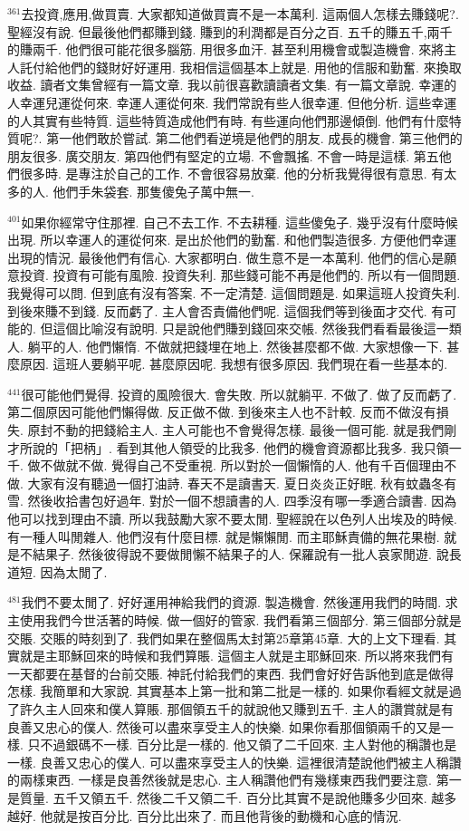 \documentclass{book}
\begin{document}
$^{361}$去投資,應用,做買賣.
大家都知道做買賣不是一本萬利.
這兩個人怎樣去賺錢呢?.
聖經沒有說.
但最後他們都賺到錢.
賺到的利潤都是百分之百.
五千的賺五千,兩千的賺兩千.
他們很可能花很多腦筋.
用很多血汗.
甚至利用機會或製造機會.
來將主人託付給他們的錢財好好運用.
我相信這個基本上就是.
用他的信服和勤奮.
來換取收益.
讀者文集曾經有一篇文章.
我以前很喜歡讀讀者文集.
有一篇文章說.
幸運的人幸運兒運從何來.
幸運人運從何來.
我們常說有些人很幸運.
但他分析.
這些幸運的人其實有些特質.
這些特質造成他們有時.
有些運向他們那邊傾倒.
他們有什麼特質呢?.
第一他們敢於嘗試.
第二他們看逆境是他們的朋友.
成長的機會.
第三他們的朋友很多.
廣交朋友.
第四他們有堅定的立場.
不會飄搖.
不會一時是這樣.
第五他們很多時.
是專注於自己的工作.
不會很容易放棄.
他的分析我覺得很有意思.
有太多的人.
他們手朱袋套.
那隻傻兔子萬中無一.

$^{401}$如果你經常守住那裡.
自己不去工作.
不去耕種.
這些傻兔子.
幾乎沒有什麼時候出現.
所以幸運人的運從何來.
是出於他們的勤奮.
和他們製造很多.
方便他們幸運出現的情況.
最後他們有信心.
大家都明白.
做生意不是一本萬利.
他們的信心是願意投資.
投資有可能有風險.
投資失利.
那些錢可能不再是他們的.
所以有一個問題.
我覺得可以問.
但到底有沒有答案.
不一定清楚.
這個問題是.
如果這班人投資失利.
到後來賺不到錢.
反而虧了.
主人會否責備他們呢.
這個我們等到後面才交代.
有可能的.
但這個比喻沒有說明.
只是說他們賺到錢回來交帳.
然後我們看看最後這一類人.
躺平的人.
他們懶惰.
不做就把錢埋在地上.
然後甚麼都不做.
大家想像一下.
甚麼原因.
這班人要躺平呢.
甚麼原因呢.
我想有很多原因.
我們現在看一些基本的.

$^{441}$很可能他們覺得.
投資的風險很大.
會失敗.
所以就躺平.
不做了.
做了反而虧了.
第二個原因可能他們懶得做.
反正做不做.
到後來主人也不計較.
反而不做沒有損失.
原封不動的把錢給主人.
主人可能也不會覺得怎樣.
最後一個可能.
就是我們剛才所說的「把柄」.
看到其他人領受的比我多.
他們的機會資源都比我多.
我只領一千.
做不做就不做.
覺得自己不受重視.
所以對於一個懶惰的人.
他有千百個理由不做.
大家有沒有聽過一個打油詩.
春天不是讀書天.
夏日炎炎正好眠.
秋有蚊蟲冬有雪.
然後收拾書包好過年.
對於一個不想讀書的人.
四季沒有哪一季適合讀書.
因為他可以找到理由不讀.
所以我鼓勵大家不要太閒.
聖經說在以色列人出埃及的時候.
有一種人叫閒雜人.
他們沒有什麼目標.
就是懶懶閒.
而主耶穌責備的無花果樹.
就是不結果子.
然後彼得說不要做閒懶不結果子的人.
保羅說有一批人哀家閒遊.
說長道短.
因為太閒了.

$^{481}$我們不要太閒了.
好好運用神給我們的資源.
製造機會.
然後運用我們的時間.
求主使用我們今世活著的時候.
做一個好的管家.
我們看第三個部分.
第三個部分就是交賬.
交賬的時刻到了.
我們如果在整個馬太封第25章第45章.
大的上文下理看.
其實就是主耶穌回來的時候和我們算賬.
這個主人就是主耶穌回來.
所以將來我們有一天都要在基督的台前交賬.
神託付給我們的東西.
我們會好好告訴他到底是做得怎樣.
我簡單和大家說.
其實基本上第一批和第二批是一樣的.
如果你看經文就是過了許久主人回來和僕人算賬.
那個領五千的就說他又賺到五千.
主人的讚賞就是有良善又忠心的僕人.
然後可以盡來享受主人的快樂.
如果你看那個領兩千的又是一樣.
只不過銀碼不一樣.
百分比是一樣的.
他又領了二千回來.
主人對他的稱讚也是一樣.
良善又忠心的僕人.
可以盡來享受主人的快樂.
這裡很清楚說他們被主人稱讚的兩樣東西.
一樣是良善然後就是忠心.
主人稱讚他們有幾樣東西我們要注意.
第一是質量.
五千又領五千.
然後二千又領二千.
百分比其實不是說他賺多少回來.
越多越好.
他就是按百分比.
百分比出來了.
而且他背後的動機和心底的情況.
\end{document}
